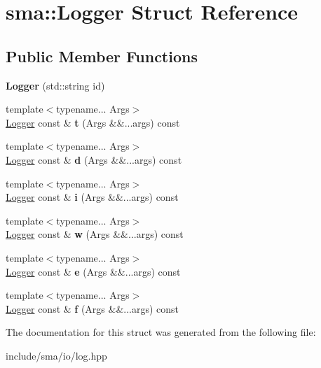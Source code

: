 \hypertarget{structsma_1_1Logger}{\section{sma\-:\-:Logger Struct Reference}
\label{structsma_1_1Logger}
}
\subsection*{Public Member Functions}
\begin{DoxyCompactItemize}
\item 
\hypertarget{structsma_1_1Logger_aa3adf99841d56561e64dc7feb77d4e78}{{\bfseries Logger} (std\-::string id)}\label{structsma_1_1Logger_aa3adf99841d56561e64dc7feb77d4e78}

\item 
\hypertarget{structsma_1_1Logger_abb1b7810f6a3049162b330fbbcc77a44}{{\footnotesize template$<$typename... Args$>$ }\\\hyperlink{structsma_1_1Logger}{Logger} const \& {\bfseries t} (Args \&\&...args) const }\label{structsma_1_1Logger_abb1b7810f6a3049162b330fbbcc77a44}

\item 
\hypertarget{structsma_1_1Logger_a3ed4dcc5f23e11bc92ddc6b3abebf4f4}{{\footnotesize template$<$typename... Args$>$ }\\\hyperlink{structsma_1_1Logger}{Logger} const \& {\bfseries d} (Args \&\&...args) const }\label{structsma_1_1Logger_a3ed4dcc5f23e11bc92ddc6b3abebf4f4}

\item 
\hypertarget{structsma_1_1Logger_acbe6362c4d08b6da868ff5b55b255201}{{\footnotesize template$<$typename... Args$>$ }\\\hyperlink{structsma_1_1Logger}{Logger} const \& {\bfseries i} (Args \&\&...args) const }\label{structsma_1_1Logger_acbe6362c4d08b6da868ff5b55b255201}

\item 
\hypertarget{structsma_1_1Logger_a6da957582bb2e7752c55677330ce6944}{{\footnotesize template$<$typename... Args$>$ }\\\hyperlink{structsma_1_1Logger}{Logger} const \& {\bfseries w} (Args \&\&...args) const }\label{structsma_1_1Logger_a6da957582bb2e7752c55677330ce6944}

\item 
\hypertarget{structsma_1_1Logger_ab21f9f52bb22c0df8f943b5774fc7be7}{{\footnotesize template$<$typename... Args$>$ }\\\hyperlink{structsma_1_1Logger}{Logger} const \& {\bfseries e} (Args \&\&...args) const }\label{structsma_1_1Logger_ab21f9f52bb22c0df8f943b5774fc7be7}

\item 
\hypertarget{structsma_1_1Logger_a43d1684ce6e1e3ec15cbd93f285368fe}{{\footnotesize template$<$typename... Args$>$ }\\\hyperlink{structsma_1_1Logger}{Logger} const \& {\bfseries f} (Args \&\&...args) const }\label{structsma_1_1Logger_a43d1684ce6e1e3ec15cbd93f285368fe}

\end{DoxyCompactItemize}


The documentation for this struct was generated from the following file\-:\begin{DoxyCompactItemize}
\item 
include/sma/io/log.\-hpp\end{DoxyCompactItemize}
